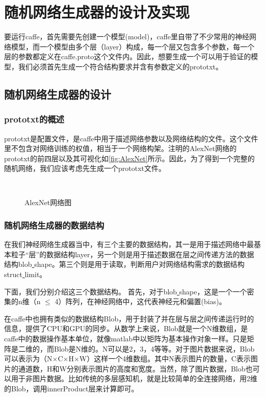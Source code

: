 ﻿\chapter{随机网络生成器的设计及实现}
要运行caffe，首先需要先创建一个模型(model)，caffe里自带了不少常用的神经网络模型，而一个模型由多个层（layer）构成，每一个层又包含多个参数，每一个层的参数都定义在caffe.proto这个文件内。因此，想要生成一个可以用于验证的模型，我们必须首先生成一个符合结构要求并含有参数定义的prototxt。
\section{随机网络生成器的设计}
\subsection{prototxt的概述}
prototxt是配置文件，是caffe中用于描述网络参数以及网络结构的文件。这个文件里不包含对网络训练的权值，相当于一个网络构架。注明的AlexNet网络的prototxt的前四层以及其可视化如\autoref{fig:AlexNet}所示。因此，为了得到一个完整的随机网络，我们应该考虑先生成一个prototxt文件。

\begin{figure}[!htbp]
\centering 
{}
\\
\caption{AlexNet网络图}
\label{fig:AlexNet}
\end{figure}

\subsection{随机网络生成器的数据结构}
在我们神经网络生成器当中，有三个主要的数据结构，其一是用于描述网络中最基本粒子“层”的数据结构layer，另一个则是用于描述数据在层之间传递方法的数据结构blob\underline{ }shape。第三个则是用于读取，判断用户对网络结构需求的数据结构struct\underline{ }limit。

下面，我们分别介绍这三个数据结构。
首先，对于blob\underline{ }shape，这是一个一个密集的n维（n $\leq$ 4）阵列，在神经网络中，这代表神经元和偏置(bias)。

在caffe中也拥有类似的数据结构Blob，用于封装了并在层与层之间传递运行时的信息，提供了CPU和GPU的同步。从数学上来说，Blob就是一个N维数组，是caffe中的数据操作基本单位，就像matlab中以矩阵为基本操作对象一样。只是矩阵是二维的，而Blob是N维的。N可以是2，3，4等等。对于图片数据来说，Blob可以表示为（N$\times$C$\times$H$\times$W）这样一个4维数组。其中N表示图片的数量，C表示图片的通道数，H和W分别表示图片的高度和宽度。当然，除了图片数据，Blob也可以用于非图片数据。比如传统的多层感知机，就是比较简单的全连接网络，用2维的Blob，调用innerProduct层来计算即可。

